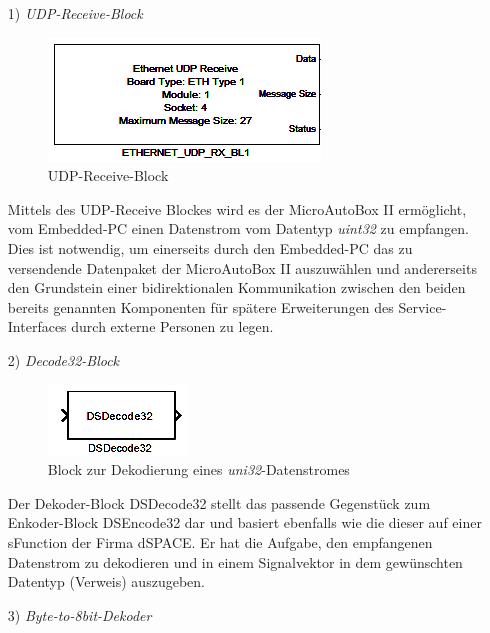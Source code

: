 \documentclass[fontsize = 12pt, paper = a4]{scrreprt}
\begin{document}
\begin{itemize}

\item[1)] \textit{UDP-Receive-Block}

\begin{figure}[h]
\centering
\includegraphics[scale = 0.8]{eth_udp_rx}
\caption[UDP-Receive]{UDP-Receive-Block}
\label{UDP-Receive}
\end{figure}

Mittels des UDP-Receive Blockes wird es der MicroAutoBox II ermöglicht, vom Embedded-PC einen Datenstrom vom Datentyp \textit{uint32} zu empfangen. Dies ist notwendig, um einerseits durch den Embedded-PC das zu versendende Datenpaket der MicroAutoBox II auszuwählen und andererseits den Grundstein einer bidirektionalen Kommunikation zwischen den beiden bereits genannten Komponenten für spätere Erweiterungen des Service-Interfaces durch externe Personen zu legen.

\newpage

\item[2)] \textit{Decode32-Block}

\begin{figure}[h]
\centering
\includegraphics[scale = 0.8]{decode32}
\caption[DSDecode32-Block]{Block zur Dekodierung eines \textit{uni32}-Datenstromes}
\label{UDP-Receive}
\end{figure}

Der Dekoder-Block DSDecode32 stellt das passende Gegenstück zum Enkoder-Block DSEncode32 dar und basiert ebenfalls wie die dieser auf einer sFunction der Firma dSPACE. Er hat die Aufgabe, den empfangenen Datenstrom zu dekodieren und in einem Signalvektor in dem gewünschten Datentyp (Verweis) auszugeben. 

\item[3)] \textit{Byte-to-8bit-Dekoder}


\end{itemize}
\end{document}
